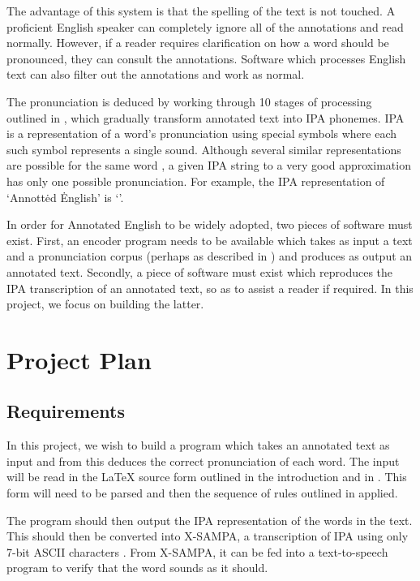 \documentclass[fleqn]{llncs}
\newcommand{\st}[1]{\textsyllabic{#1}}
\newcommand{\iot}[1]{\.{#1}}
\begin{document}
The advantage of this system is that the spelling of the text is not touched. A proficient English speaker can completely ignore all of the annotations and read normally. However, if a reader requires clarification on how a word should be pronounced, they can consult the annotations. Software which processes English text can also filter out the annotations and work as normal.

The pronunciation is deduced by working through 10 stages of processing outlined in \cite{jose}, which gradually transform annotated text into IPA phonemes. IPA is a representation of a word's pronunciation using special symbols where each such symbol represents a single sound. Although several similar representations are possible for the same word \cite{ipapron}, a given IPA string to a very good approximation has only one possible pronunciation. For example, the IPA representation of `Annot\st{a}t\iot{e}d \iot{E}nglish' is `'.

In order for Annotated English to be widely adopted, two pieces of software must exist. First, an encoder program needs to be available which takes as input a text and a pronunciation corpus (perhaps as described in \cite{ipapron}) and produces as output an annotated text. Secondly, a piece of software must exist which reproduces the IPA transcription of an annotated text, so as to assist a reader if required. In this project, we focus on building the latter.

\section{Project Plan}

\subsection{Requirements}
In this project, we wish to build a program which takes an annotated text as input and from this deduces the correct pronunciation of each word. The input will be read in the {\LaTeX} source form outlined in the introduction and in \cite{jose}. This form will need to be parsed and then the sequence of rules outlined in \cite{jose} applied.

The program should then output the IPA representation of the words in the text. This should then be converted into X-SAMPA, a transcription of IPA using only 7-bit ASCII characters \cite{sampa}. From X-SAMPA, it can be fed into a text-to-speech program to verify that the word sounds as it should.
\end{document}

